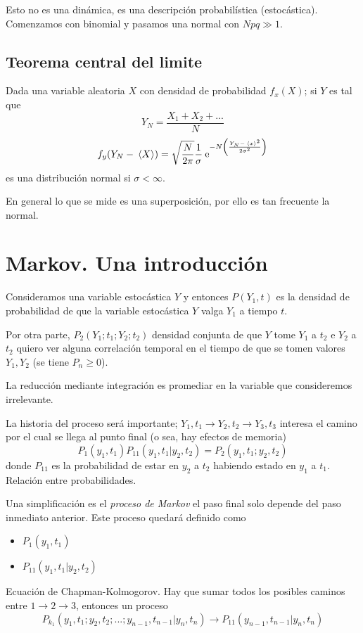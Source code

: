 \documentclass[10pt,oneside]{CBFT_book}
\begin{document}
Esto no es una dinámica, es una descripción probabilística (estocástica).
Comenzamos con binomial y pasamos una normal con $Npq \gg 1$.

\subsection{Teorema central del limite}

Dada una variable aleatoria $X$ con densidad de probabilidad $f_x(X)$; si $Y$ es tal que 
\[
	Y_N = \frac{X_1 + X_2 + ... }{ N }
\]
\[
	f_y( Y_N - \:\left\langle X \right\rangle ) = \sqrt{\frac{N}{2\pi}} \frac{1}{\sigma} 
		\:\mathrm{e}^{ -N \left( \frac{  Y_N - \:\left\langle x \right\rangle^2  }{ 2\sigma^2 } \right) }
\]
es una distribución normal si $\sigma < \infty $.

En general lo que se mide es una superposición, por ello es tan frecuente la normal.

\section{Markov. Una introducción}

Consideramos una variable estocástica $Y$ y entonces $P(Y_1,t)$ es la densidad de probabilidad
de que la variable estocástica $Y$ valga $Y_1$ a tiempo $t$.

Por otra parte, $P_2(Y_1;t_1;Y_2;t_2)$ densidad conjunta de que $Y$ tome $Y_1$ a $t_2$ e $Y_2$ a $t_2$
quiero ver alguna correlación temporal en el tiempo de que se tomen valores $Y_1, Y_2$ (se tiene
$P_n \geq 0$).

La reducción mediante integración es promediar en la variable que consideremos irrelevante.

La historia del proceso será importante; $Y_1,t_1 \to Y_2,t_2 \to Y_3,t_3 $ interesa el
camino por el cual se llega al punto final (o sea, hay efectos de memoria)
\[
	P_1(y_1,t_1) P_{11}(y_1,t_1|y_2,t_2) = P_2(y_1,t_1;y_2,t_2)
\]
donde $P_{11}$ es la probabilidad de estar en $y_2$ a $t_2$ habiendo estado en $y_1$ a $t_1$.
Relación entre probabilidades.

Una simplificación es el {\it proceso de Markov} el paso final solo depende del paso inmediato
anterior. Este proceso quedará definido como
\begin{itemize}
	\item $ P_1(y_1,t_1) $
	\item $ P_{11}(y_1,t_1|y_2,t_2) $
\end{itemize}

Ecuación de Chapman-Kolmogorov. Hay que sumar todos los posibles caminos entre $1 \to 2 \to 3$,
entonces un proceso 
\[
	P_{k_1}(y_1,t_1;y_2,t_2;...;y_{n-1},t_{n-1}|y_n,t_n) \to P_{11}(y_{n-1},t_{n-1}|y_n,t_n)
\]
\end{document}
